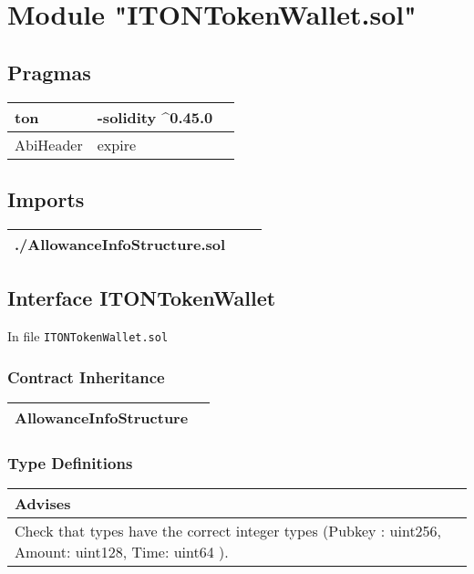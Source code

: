 
\section{Module "ITONTokenWallet.sol"}


\subsection{Pragmas}


\noindent\begin{tabular}{|l|l|p{5cm}|}\hline
ton & -solidity \^{}0.45.0 &\\\hline
AbiHeader &  expire &\\\hline
\end{tabular}


\subsection{Imports}


\noindent\begin{tabular}{|l|l|p{5cm}|}\hline
./AllowanceInfoStructure.sol &\\\hline
\end{tabular}


\subsection{Interface ITONTokenWallet}


In file {\tt ITONTokenWallet.sol}

\subsubsection{Contract Inheritance}


\noindent\begin{tabular}{|l|p{5cm}|}\hline
AllowanceInfoStructure & \\\hline
\end{tabular}


\subsubsection{Type Definitions}


\ifsoldraft
\noindent\begin{tabular}{|p{12cm}|}\hline
\rowcolor{green}Advises
\\\hline
Check that types have the correct integer types (Pubkey : uint256, Amount: uint128, Time: uint64 ).
\\\hline\end{tabular}
\fi

